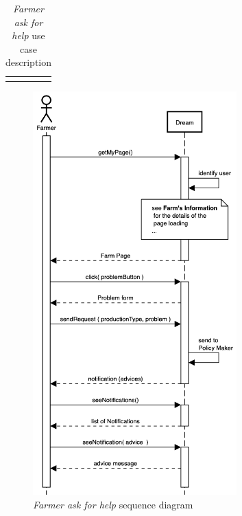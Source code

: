 \begin{enumerate}
\begin{longtable}{p{0.26\linewidth}p{0.75\linewidth}}
        \bottomrule
        \caption{\emph{Farmer ask for help} use case description}
    \end{longtable}
    \begin{figure}[H]
        \begin{center}
        \includegraphics[width=0.7\textwidth]{sequence/HelpRequest.png}
        \caption{\emph{Farmer ask for help} sequence diagram}
        \label{fig:sequence6}
        \end{center}
    \end{figure}


\end{enumerate}
